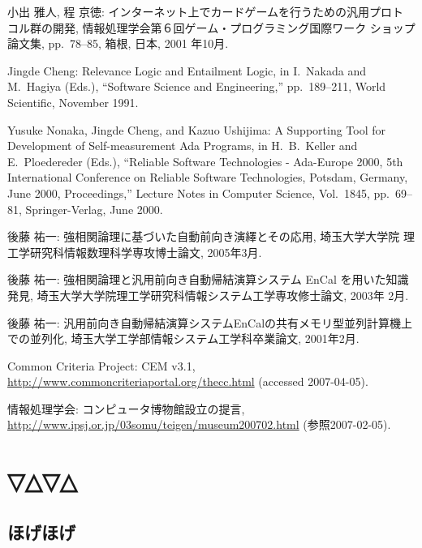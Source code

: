 \documentclass[a4paper, 12pt]{ltjreport}
\begin{document}
\begin{thebibliography}{99}
小出 雅人, 程 京徳: インターネット上でカードゲームを行うための汎用プロト
        コル群の開発, 情報処理学会第６回ゲーム・プログラミング国際ワーク
        ショップ論文集, pp.\ 78--85, 箱根, 日本, 2001 年10月.

Jingde Cheng: Relevance Logic and Entailment Logic, in I.\ Nakada and
        M.\ Hagiya (Eds.), ``Software Science and Engineering,''
        pp.\ 189--211, World Scientific, November 1991.

Yusuke Nonaka, Jingde Cheng, and Kazuo Ushijima: A Supporting Tool for
        Development of Self-measurement Ada Programs, in H.\ B.\ Keller
        and E.\ Ploedereder (Eds.), ``Reliable Software Technologies -
        Ada-Europe 2000, 5th International Conference on Reliable
        Software Technologies, Potsdam, Germany, June 2000,
        Proceedings,'' Lecture Notes in Computer Science, Vol.\ 1845,
        pp.\ 69--81, Springer-Verlag, June 2000.


後藤 祐一: 強相関論理に基づいた自動前向き演繹とその応用, 埼玉大学大学院
	理工学研究科情報数理科学専攻博士論文, 2005年3月.

後藤 祐一: 強相関論理と汎用前向き自動帰結演算システム EnCal を用いた知識
	発見, 埼玉大学大学院理工学研究科情報システム工学専攻修士論文, 2003年
	2月.

後藤 祐一: 汎用前向き自動帰結演算システムEnCalの共有メモリ型並列計算機上
	での並列化, 埼玉大学工学部情報システム工学科卒業論文, 2001年2月.


Common Criteria Project: CEM v3.1,
\url{http://www.commoncriteriaportal.org/thecc.html}
(accessed 2007-04-05).

情報処理学会: コンピュータ博物館設立の提言, \url{http://www.ipsj.or.jp/03somu/teigen/museum200702.html} (参照2007-02-05).

\end{thebibliography}

\appendix %
\chapter{▽△▽△}
\section{ほげほげ}
\end{document}
